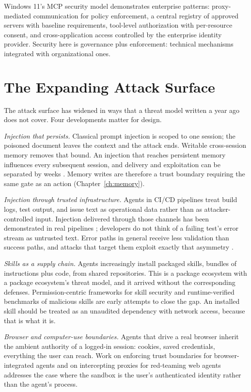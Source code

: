 \documentclass[11pt]{book}
\begin{document}
Windows 11's MCP security model \cite{windowsmcp2025} demonstrates enterprise patterns: proxy-mediated communication for policy enforcement, a central registry of approved servers with baseline requirements, tool-level authorization with per-resource consent, and cross-application access controlled by the enterprise identity provider. Security here is governance plus enforcement: technical mechanisms integrated with organizational ones.

\section{The Expanding Attack Surface}

The attack surface has widened in ways that a threat model written a year ago does not cover. Four developments matter for design.

\textit{Injection that persists.} Classical prompt injection is scoped to one session; the poisoned document leaves the context and the attack ends. Writable cross-session memory removes that bound. An injection that reaches persistent memory influences every subsequent session, and delivery and exploitation can be separated by weeks \cite{crosssession2026, memsec2026}. Memory writes are therefore a trust boundary requiring the same gate as an action (Chapter~\ref{ch:memory}).

\textit{Injection through trusted infrastructure.} Agents in CI/CD pipelines treat build logs, test output, and issue text as operational data rather than as attacker-controlled input. Injection delivered through those channels has been demonstrated in real pipelines \cite{gitinject2026}; developers do not think of a failing test's error stream as untrusted text. Error paths in general receive less validation than success paths, and attacks that target them exploit exactly that asymmetry \cite{vats2026}.

\textit{Skills as a supply chain.} Agents increasingly install packaged skills, bundles of instructions plus code, from shared repositories. This is a package ecosystem with a package ecosystem's threat model, and it arrived without the corresponding defenses. Permission-centric frameworks for skill security \cite{skillguard2026} and runtime-verified benchmarks of malicious skills \cite{malskill2026} are early attempts to close the gap. An installed skill should be treated as an unaudited dependency with network access, because that is what it is.

\textit{Browser and computer-use boundaries.} Agents that drive a real browser inherit the ambient authority of a logged-in session: cookies, saved credentials, everything the user can reach. Work on enforcing trust boundaries for browser-integrated agents \cite{webmcp2026} and on intercepting proxies for red-teaming web agents \cite{ipiproxy2026} addresses the case where the sandbox is the user's authenticated identity rather than the agent's process.
\end{document}
